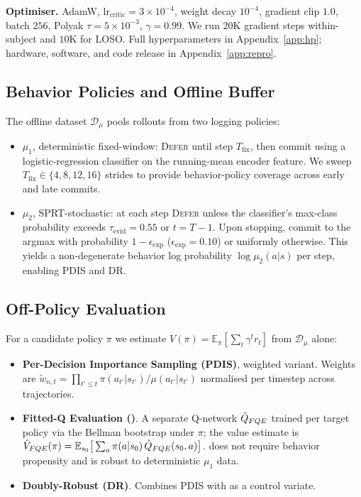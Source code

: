 \textbf{Optimiser.} AdamW, $\text{lr}_{\text{critic}} = 3 \times 10^{-4}$,
weight decay $10^{-4}$, gradient clip $1.0$, batch $256$, Polyak
$\tau = 5\times 10^{-3}$, $\gamma = 0.99$. We run $20$K gradient steps
within-subject and $10$K for LOSO. Full hyperparameters in
Appendix~\ref{app:hp}; hardware, software, and code release in
Appendix~\ref{app:repro}.

\subsection{Behavior Policies and Offline Buffer}\label{sec:methods:behavior}

The offline dataset $\mathcal{D}_\mu$ pools rollouts from two logging
policies:
\begin{itemize}
\item $\mu_1$, deterministic fixed-window: \textsc{Defer} until step
$T_{\text{fix}}$, then commit using a logistic-regression classifier on
the running-mean encoder feature. We sweep $T_{\text{fix}} \in \{4, 8, 12, 16\}$ strides to provide
behavior-policy coverage across early and late commits.
\item $\mu_2$, SPRT-stochastic: at each step \textsc{Defer} unless the
classifier's max-class probability exceeds $\tau_{\text{evid}} = 0.55$
or $t = T-1$. Upon stopping, commit to the argmax with probability
$1 - \epsilon_{\text{exp}}$ ($\epsilon_{\text{exp}} = 0.10$) or
uniformly otherwise. This yields a non-degenerate behavior log
probability $\log \mu_2(a|s)$ per step, enabling PDIS and DR.
\end{itemize}

\subsection{Off-Policy Evaluation}\label{sec:methods:ope}

For a candidate policy $\pi$ we estimate
$V(\pi) = \mathbb{E}_\pi[\sum_t \gamma^t r_t]$ from $\mathcal{D}_\mu$ alone:
\begin{itemize}
\item \textbf{Per-Decision Importance Sampling (PDIS)}, weighted variant.
Weights are $\tilde w_{n,t} = \prod_{t' \le t} \pi(a_{t'}|s_{t'})/\mu(a_{t'}|s_{t'})$
normalised per timestep across trajectories.
\item \textbf{Fitted-Q Evaluation (\fqe{})}. A separate Q-network
$\hat Q_{FQE}$ trained per target policy via the Bellman bootstrap
under $\pi$; the value estimate is
$\hat V_{FQE}(\pi) = \mathbb{E}_{s_0}\big[\sum_a \pi(a|s_0)\, \hat Q_{FQE}(s_0, a)\big]$.
\fqe{} does not require behavior propensity and is robust to
deterministic $\mu_1$ data.
\item \textbf{Doubly-Robust (DR)}. Combines PDIS with \fqe{} as a control
variate.
\end{itemize}

